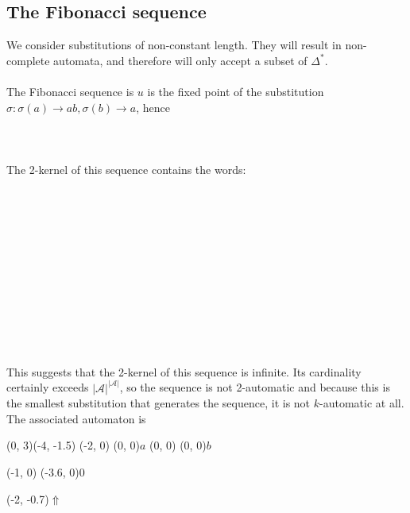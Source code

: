 \documentclass{article}
\begin{document}
\subsection{The Fibonacci sequence}
We consider substitutions of non-constant length. They will result in 
non-complete automata, and therefore will only accept a subset of $\Delta^*$.\\
\\
The Fibonacci sequence is $u$ is the fixed point of the substitution 
$\sigma: \sigma(a) \to ab, \sigma(b) \to a$, hence\\
\\
\\
\\
The 2-kernel of this sequence contains the words:\\
\\
\\
\\
\\
\\
\\
\\
\\
\\
\\
\monoit{}\\
\\
This suggests that the 2-kernel of this sequence is infinite. Its cardinality
certainly exceeds $|\mathcal{A}|^{|\mathcal{A}|}$, 
so the sequence is not 2-automatic and because this is the smallest 
substitution that generates the sequence, it is not $k$-automatic at all. The 
associated automaton is\\
\begin{graph}(0, 3)(-4, -1.5)
  (-2, 0) (0, 0){$a$}
  (0, 0)  (0, 0){$b$}

  (-1, 0) \freetext(-3.6, 0){0}
   
   

  \freetext(-2, -0.7){$\Uparrow$}
\end{graph}\\
\end{document}
